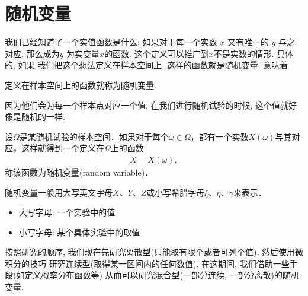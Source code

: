 \section{随机变量}

我们已经知道了一个实值函数是什么: 如果对于每一个实数 $x$ 又有唯一的 $y$ 与之对应, 
那么成为$y$ 为实变量$x$的函数. 这个定义可以推广到$x$不是实数的情形. 具体的, 如果
我们把这个想法定义在样本空间上, 这样的函数就是随机变量. 意味着

\begin{definition*}
    定义在样本空间上的函数就称为随机变量.
\end{definition*}

因为他们会为每一个样本点对应一个值, 在我们进行随机试验的时候, 这个值就好像是随机的一样. 

\begin{definition}[随机变量]
    设$\Omega$是某随机试验的样本空间．如果对于每个$\omega\in\Omega$，都有一个实数$X(\omega)$与其对应，这样就得到一个定义在$\Omega$上的函数
    \begin{align*}
    X=X(\omega),
    \end{align*}
    称该函数为随机变量(random variable)．
\end{definition}
随机变量一般用大写英文字母$X$、$Y$、$Z$或小写希腊字母$\xi$、$\eta$、$\gamma$来表示．
\begin{itemize}
    \item 大写字母: 一个实验中的值
    \item 小写字母: 某个具体实验中的取值
\end{itemize}

按照研究的顺序, 我们现在先研究离散型(只能取有限个或者可列个值), 然后使用微积分的技巧
研究连续型(取得某一区间内的任何数值). 在这期间, 我们借助一些手段(如定义概率分布函数等)
从而可以研究混合型(一部分连续, 一部分离散)的随机变量. 